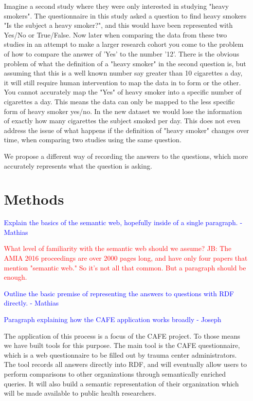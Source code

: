 \documentclass{amia}
\begin{document}
Imagine a second study where they were only interested in studying "heavy smokers".
The questionnaire in this study asked a question to find heavy smokers "Is the subject a heavy smoker?", and this would have been represented with Yes/No or True/False.
Now later when comparing the data from these two studies in an attempt to make a larger research cohort you come to the problem of how to compare the answer of 'Yes' to the number '12'.
There is the obvious problem of what the definition of a "heavy smoker" in the second question is, but assuming that this is a well known number say greater than 10 cigarettes a day, it will still require human intervention to map the data in to form or the other.
You cannot accurately map the "Yes" of heavy smoker into a specific number of cigarettes a day.
This means the data can only be mapped to the less specific form of heavy smoker yes/no.
In the new dataset we would lose the information of exactly how many cigarettes the subject smoked per day.
This does not even address the issue of what happens if the definition of "heavy smoker" changes over time, when comparing two studies using the same question.

We propose a different way of recording the answers to the questions, which more accurately represents what the question is asking.

\section*{Methods}
\textcolor{blue}{Explain the basics of the semantic web, hopefully inside of a single paragraph. - Mathias}

\textcolor{red}{What level of familiarity with the semantic web should we assume?}
\textcolor{red}{JB: The AMIA 2016 proceedings are over 2000 pages long, and have only four papers that mention "semantic web." So it's not all that common. But a paragraph should be enough.}

\textcolor{blue}{Outline the basic premise of representing the answers to questions with RDF directly. - Mathias}

\textcolor{blue}{Paragraph explaining how the CAFE application works broadly - Joseph}

The application of this process is a focus of the CAFE project.
To those means we have built tools for this purpose.
The main tool is the CAFE questionnaire, which is a web questionnaire to be filled out by trauma center administrators.
The tool records all answers directly into RDF, and will eventually allow users to perform comparisons to other organizations through semantically enriched queries.
It will also build a semantic representation of their organization which will be made available to public health researchers.
\end{document}
